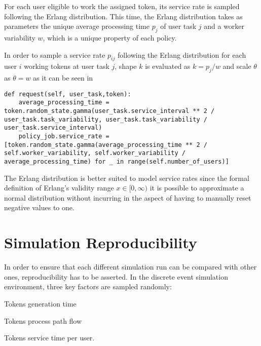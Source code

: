 For each user eligible to work the assigned token, its service rate is sampled following the Erlang distribution. This time, the Erlang distribution takes as parameters the unique average processing time $p_j$ of user task $j$ and a worker variability $w$, which is a unique property of each policy.

In order to sample a service rate $p_{ij}$ following the Erlang distribution for each user $i$ working tokens at user task $j$, shape $k$ is evaluated as $k=p_j/w$ and scale $\theta$ as $\theta = w$ as it can be seen in 

\begin{lstlisting}[caption={User service rate sampling following an Erlang distribution where initially the average processing time is sampled. Afterwards, for each user a service time is sampled yet again relying on the formerly sampled average processing time and is assigned as an array to the policy job.},label=lst:user_service_rate,style=CustomPython]
def request(self, user_task,token):
    average_processing_time = token.random_state.gamma(user_task.service_interval ** 2 / user_task.task_variability, user_task.task_variability / user_task.service_interval)
    policy_job.service_rate = [token.random_state.gamma(average_processing_time ** 2 / self.worker_variability, self.worker_variability / average_processing_time) for _ in range(self.number_of_users)]
\end{lstlisting}

The Erlang distribution is better suited to model service rates since the formal definition of Erlang's validity range $x \in [0,\infty)$ it is possible to approximate a normal distribution without incurring in the aspect of having to manually reset negative values to one.

\section{Simulation Reproducibility}
\label{sec:sim_reproducibility}

In order to ensure that each different simulation run can be compared with other ones, reproducibility has to be asserted. In the discrete event simulation environment, three key factors are sampled randomly:
\begin{enumerate*}
    \item Tokens generation time
    \item Tokens process path flow
    \item Tokens service time per user.
\end{enumerate*}

